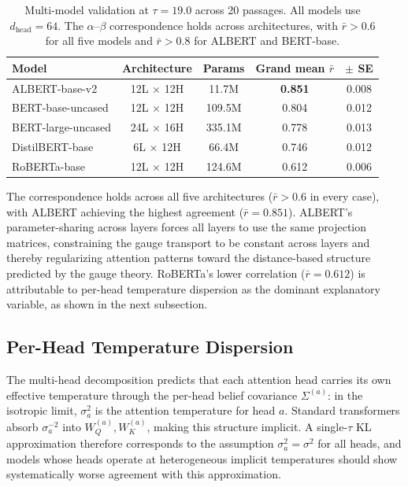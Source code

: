 \documentclass[twoside,11pt]{article}
\begin{document}
\begin{table}[h]
\centering
\renewcommand{\arraystretch}{1.15}
\begin{tabular}{lcccc}
\hline
\textbf{Model} & \textbf{Architecture} & \textbf{Params} & Grand mean $\bar{r}$ & $\pm$ SE \\
\hline
ALBERT-base-v2 & 12L $\times$ 12H & 11.7M & \textbf{0.851} & 0.008 \\
BERT-base-uncased & 12L $\times$ 12H & 109.5M & 0.804 & 0.012 \\
BERT-large-uncased & 24L $\times$ 16H & 335.1M & 0.778 & 0.013 \\
DistilBERT-base & 6L $\times$ 12H & 66.4M & 0.746 & 0.012 \\
RoBERTa-base & 12L $\times$ 12H & 124.6M & 0.612 & 0.006 \\
\hline
\end{tabular}
\caption{Multi-model validation at $\tau = 19.0$ across 20 passages. All models use $d_{\text{head}} = 64$. The $\alpha$--$\beta$ correspondence holds across architectures, with $\bar{r} > 0.6$ for all five models and $\bar{r} > 0.8$ for ALBERT and BERT-base.}
\label{tab:multi_model_supp}
\end{table}

The correspondence holds across all five architectures ($\bar{r} > 0.6$ in every case), with ALBERT achieving the highest agreement ($\bar{r} = 0.851$). ALBERT's parameter-sharing across layers forces all layers to use the same projection matrices, constraining the gauge transport to be constant across layers and thereby regularizing attention patterns toward the distance-based structure predicted by the gauge theory. RoBERTa's lower correlation ($\bar{r} = 0.612$) is attributable to per-head temperature dispersion as the dominant explanatory variable, as shown in the next subsection.

\subsection{Per-Head Temperature Dispersion}

The multi-head decomposition predicts that each attention head carries its own effective temperature through the per-head belief covariance $\Sigma^{(a)}$: in the isotropic limit, $\sigma_a^2$ is the attention temperature for head $a$. Standard transformers absorb $\sigma_a^{-2}$ into $W_Q^{(a)}, W_K^{(a)}$, making this structure implicit. A single-$\tau$ KL approximation therefore corresponds to the assumption $\sigma_a^2 = \sigma^2$ for all heads, and models whose heads operate at heterogeneous implicit temperatures should show systematically worse agreement with this approximation.
\end{document}
